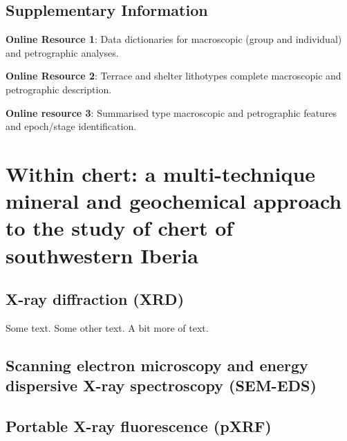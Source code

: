 \documentclass[
  a4paper,
  DIV=11,
  numbers=noendperiod]{scrreprt}
\begin{document}
\section*{Supplementary Information}\label{supplementary-information}


\textbf{Online Resource 1}: Data dictionaries for macroscopic (group and
individual) and petrographic analyses.

\textbf{Online Resource 2}: Terrace and shelter lithotypes complete
macroscopic and petrographic description.

\textbf{Online resource 3}: Summarised type macroscopic and petrographic
features and epoch/stage identification.


\chapter{Within chert: a multi-technique mineral and geochemical
approach to the study of chert of southwestern
Iberia}\label{within-chert-a-multi-technique-mineral-and-geochemical-approach-to-the-study-of-chert-of-southwestern-iberia}

\section{X-ray diffraction (XRD)}\label{x-ray-diffraction-xrd}

Some text. Some other text. A bit more of text.

\section{Scanning electron microscopy and energy dispersive X-ray
spectroscopy
(SEM-EDS)}\label{scanning-electron-microscopy-and-energy-dispersive-x-ray-spectroscopy-sem-eds}

\section{Portable X-ray fluorescence
(pXRF)}\label{portable-x-ray-fluorescence-pxrf}
\end{document}
